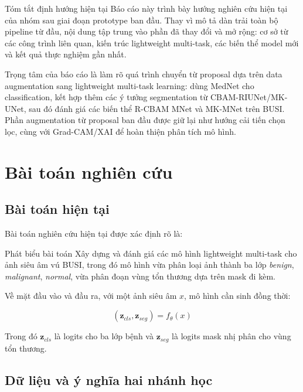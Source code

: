 \documentclass[12pt,a4paper]{article}
\begin{document}
\begin{ideabox}{Tóm tắt định hướng hiện tại}
Báo cáo này trình bày hướng nghiên cứu hiện tại của nhóm sau giai đoạn prototype ban đầu. Thay vì mô tả dàn trải toàn bộ pipeline từ đầu, nội dung tập trung vào phần đã thay đổi và mở rộng: cơ sở từ các công trình liên quan, kiến trúc lightweight multi-task, các biến thể model mới và kết quả thực nghiệm gần nhất.

Trọng tâm của báo cáo là làm rõ quá trình chuyển từ proposal dựa trên data augmentation sang lightweight multi-task learning: dùng MedNet cho classification, kết hợp thêm các ý tưởng segmentation từ CBAM-RIUNet/MK-UNet, sau đó đánh giá các biến thể R-CBAM MNet và MK-MNet trên BUSI. Phần augmentation từ proposal ban đầu được giữ lại như hướng cải tiến chọn lọc, cùng với Grad-CAM/XAI để hoàn thiện phân tích mô hình.
\end{ideabox}

\section{Bài toán nghiên cứu}

\subsection{Bài toán hiện tại}

Bài toán nghiên cứu hiện tại được xác định rõ là:

\begin{methodbox}{Phát biểu bài toán}
Xây dựng và đánh giá các mô hình lightweight multi-task cho ảnh siêu âm vú BUSI, trong đó mô hình vừa phân loại ảnh thành ba lớp \textit{benign}, \textit{malignant}, \textit{normal}, vừa phân đoạn vùng tổn thương dựa trên mask đi kèm.
\end{methodbox}

Về mặt đầu vào và đầu ra, với một ảnh siêu âm \(x\), mô hình cần sinh đồng thời:

\[
(\mathbf{z}_{cls}, \mathbf{z}_{seg}) = f_{\theta}(x)
\]

Trong đó \(\mathbf{z}_{cls}\) là logits cho ba lớp bệnh và \(\mathbf{z}_{seg}\) là logits mask nhị phân cho vùng tổn thương.

\subsection{Dữ liệu và ý nghĩa hai nhánh học}
\end{document}
